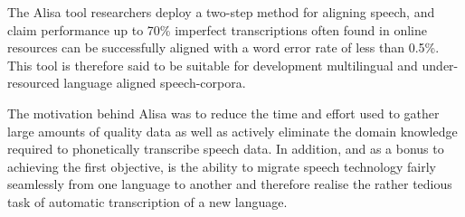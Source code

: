 The Alisa tool researchers deploy a two-step method for aligning speech, and claim performance up to 70\% imperfect transcriptions often found in online resources can be successfully aligned with a word error rate of less than 0.5\%.  This tool is therefore said to be suitable for development multilingual and under-resourced language aligned speech-corpora.

The motivation behind Alisa was to reduce the time and effort used to gather large amounts of quality data as well as actively eliminate the domain knowledge required to phonetically transcribe speech data.  In addition, and as a bonus to achieving the first objective, is the ability to migrate speech technology fairly seamlessly from one language to another and therefore realise the rather tedious task of automatic transcription of a new language.

